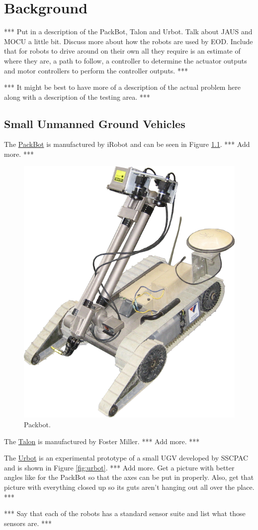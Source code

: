 \chapter{Background}
\label{ch:background}
*** Put in a description of the PackBot, Talon and Urbot. Talk about JAUS and MOCU a little bit. Discuss more about how the robots are used by EOD. Include that for robots to drive around on their own all they require is an estimate of where they are, a path to follow, a controller to determine the actuator outputs and motor controllers to perform the controller outputs. ***

*** It might be best to have more of a description of the actual problem here along with a description of the testing area. ***

\section{Small Unmanned Ground Vehicles}
\label{sec:smallugvs}
The \href{http://www.irobot.com/sp.cfm?pageid=171}{PackBot} is manufactured by iRobot and can be seen in Figure \ref{fig:packbot}. *** Add more. ***

\begin{figure}[ht!]
	\centering
	\includegraphics[width=.3\textwidth]{images/packbot}
	\caption{Packbot.}
	\label{fig:packbot}
\end{figure}

The \href{http://www.foster-miller.com/lemming.htm}{Talon} is manufactured by Foster Miller. *** Add more. ***

The \href{http://www.spawar.navy.mil/robots/land/mprs/mprs.html}{Urbot} is an experimental prototype of a small UGV developed by SSCPAC and is shown in Figure \ref{fig:urbot}. *** Add more. Get a picture with better angles like for the PackBot so that the axes can be put in properly. Also, get that picture with everything closed up so its guts aren't hanging out all over the place. ***

*** Say that each of the robots has a standard sensor suite and list what those sensors are. ***

